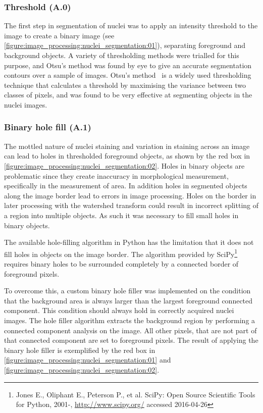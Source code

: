 \subsubsection{Threshold (A.0)}
The first step in segmentation of nuclei was to apply an intensity threshold to the image to create a binary image (see \autoref{figure:image_processing:nuclei_segmentation:01}), separating foreground and background objects. A variety of thresholding methods were trialled for this purpose, and Otsu's method was found by eye to give an accurate segmentation contours over a sample of images. Otsu's method~\cite{Otsu1979} is a widely used thresholding technique that calculates a threshold by maximising the variance between two classes of pixels, and was found to be very effective at segmenting objects in the nuclei images.

\subsubsection{Binary hole fill (A.1)}
The mottled nature of nuclei staining and variation in staining across an image can lead to holes in thresholded foreground objects, as shown by the red box in \autoref{figure:image_processing:nuclei_segmentation:02}. Holes in binary objects are problematic since they create inaccuracy in morphological measurement, specifically in the measurement of area. In addition holes in segmented objects along the image border lead to errors in image processing. Holes on the border in later processing with the watershed transform could result in incorrect splitting of a region into multiple objects. As such it was necessary to fill small holes in binary objects.

The available hole-filling algorithm in Python has the limitation that it does not fill holes in objects on the image border. The algorithm provided by SciPy\footnote{Jones E., Oliphant E., Peterson P., et al. SciPy: Open Source Scientific Tools for Python, 2001-, \url{http://www.scipy.org/} accessed 2016-04-26} requires binary holes to be surrounded completely by a connected border of foreground pixels.

To overcome this, a custom binary hole filler was implemented on the condition that the background area is always larger than the largest foreground connected component. This condition should always hold in correctly acquired nuclei images. The hole filler algorithm extracts the background region by performing a connected component analysis on the image. All other pixels, that are not part of that connected component are set to foreground pixels. The result of applying the binary hole filler is exemplified by the red box in \autoref{figure:image_processing:nuclei_segmentation:01} and \autoref{figure:image_processing:nuclei_segmentation:02}.

